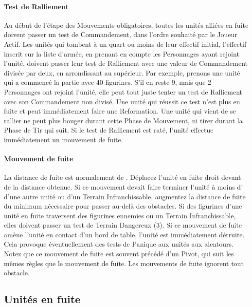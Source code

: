 \hypertarget{rallytest}{\paragraph{Test de Ralliement}}

Au début de l'étape des Mouvements obligatoires, toutes les unités alliées en fuite doivent passer un test de Commandement, dans l'ordre souhaité par le Joueur Actif. Les unités qui tombent à un quart ou moins de leur effectif initial, l'effectif inscrit sur la liste d'armée, en prenant en compte les Personnages ayant rejoint l'unité, doivent passer leur test de Ralliement avec une valeur de Commandement divisée par deux, en arrondissant au supérieur. Par exemple, prenons une unité qui a commencé la partie avec 40 figurines. S'il en reste 9, mais que 2 Personnages ont rejoint l'unité, elle peut tout juste tenter un test de Ralliement avec son Commandement non divisé. Une unité qui réussit ce test n'est plus en fuite et peut immédiatement faire une Reformation. Une unité qui vient de se rallier ne peut plus bouger durant cette Phase de Mouvement, ni tirer durant la Phase de Tir qui suit. Si le test de Ralliement est raté, l'unité effectue immédiatement un mouvement de fuite.

\hypertarget{fleemove}{\paragraph{Mouvement de fuite}}

La distance de fuite est normalement de . Déplacez l'unité en fuite droit devant de la distance obtenue. Si ce mouvement devait faire terminer l'unité à moins d' d'une autre unité ou d'un Terrain Infranchissable, augmentez la distance de fuite du minimum nécessaire pour passer au-delà des obstacles. Si des figurines d'une unité en fuite traversent des figurines ennemies ou un Terrain Infranchissable, elles doivent passer un test de Terrain Dangereux (3). Si ce mouvement de fuite amène l'unité en contact d'un bord de table, l'unité est immédiatement détruite. Cela provoque éventuellement des tests de Panique aux unités aux alentours. Notez que ce mouvement de fuite est souvent précédé d'un Pivot, qui suit les mêmes règles que le mouvement de fuite. Les mouvements de fuite ignorent tout obstacle.

\subsection{Unités en fuite}

